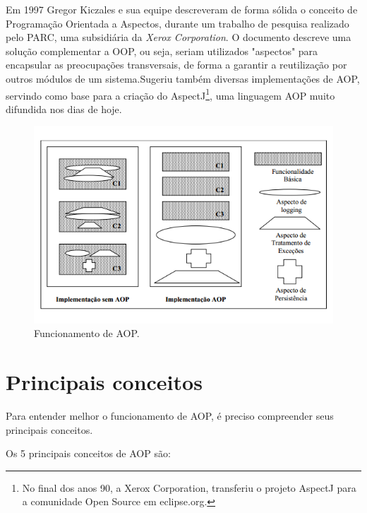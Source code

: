 \documentclass[tc,openright]{iiufrgs}
\begin{document}
Em 1997 Gregor Kiczales e sua equipe descreveram de forma sólida o conceito de Programação Orientada a Aspectos, durante um trabalho de pesquisa realizado pelo PARC, uma subsidiária da \textit{Xerox Corporation}. O documento descreve uma solução complementar a OOP, ou seja, seriam utilizados "aspectos" para encapsular as preocupações transversais, de forma a garantir a reutilização por outros módulos de um sistema.Sugeriu também diversas implementações de AOP, servindo como base para a criação do AspectJ\footnote{No final dos anos 90, a Xerox Corporation, transferiu o projeto AspectJ para a comunidade Open Source em eclipse.org.}, uma linguagem AOP muito difundida nos dias de hoje.\cite{groves2013aop}

\begin{figure}[ht]
	\centering
	\includegraphics[scale=0.6]{figuras/funcionamentoAOP.png}
	\caption{Funcionamento de AOP.}
	\label{fig:funcionamentoAOP}
\end{figure}

\section{Principais conceitos}

Para entender melhor o funcionamento de AOP, é preciso compreender seus principais conceitos. 

Os 5 principais conceitos de AOP são:
\end{document}
